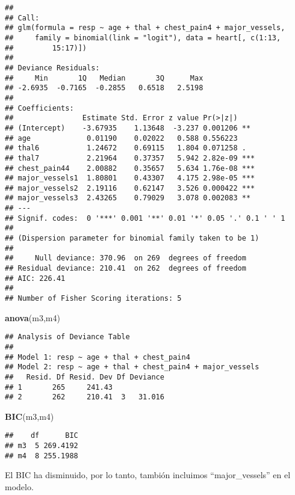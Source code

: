 \documentclass[]{article}
\newenvironment{Shaded}{\begin{snugshade}}{\end{snugshade}}
\newcommand{\KeywordTok}[1]{\textcolor[rgb]{0.13,0.29,0.53}{\textbf{#1}}}
\newcommand{\NormalTok}[1]{#1}
\begin{document}
\begin{verbatim}
## 
## Call:
## glm(formula = resp ~ age + thal + chest_pain4 + major_vessels, 
##     family = binomial(link = "logit"), data = heart[, c(1:13, 
##         15:17)])
## 
## Deviance Residuals: 
##     Min       1Q   Median       3Q      Max  
## -2.6935  -0.7165  -0.2855   0.6518   2.5198  
## 
## Coefficients:
##                Estimate Std. Error z value Pr(>|z|)    
## (Intercept)    -3.67935    1.13648  -3.237 0.001206 ** 
## age             0.01190    0.02022   0.588 0.556223    
## thal6           1.24672    0.69115   1.804 0.071258 .  
## thal7           2.21964    0.37357   5.942 2.82e-09 ***
## chest_pain44    2.00882    0.35657   5.634 1.76e-08 ***
## major_vessels1  1.80801    0.43307   4.175 2.98e-05 ***
## major_vessels2  2.19116    0.62147   3.526 0.000422 ***
## major_vessels3  2.43265    0.79029   3.078 0.002083 ** 
## ---
## Signif. codes:  0 '***' 0.001 '**' 0.01 '*' 0.05 '.' 0.1 ' ' 1
## 
## (Dispersion parameter for binomial family taken to be 1)
## 
##     Null deviance: 370.96  on 269  degrees of freedom
## Residual deviance: 210.41  on 262  degrees of freedom
## AIC: 226.41
## 
## Number of Fisher Scoring iterations: 5
\end{verbatim}

\begin{Shaded}
\begin{Highlighting}[]
\KeywordTok{anova}\NormalTok{(m3,m4)}
\end{Highlighting}
\end{Shaded}

\begin{verbatim}
## Analysis of Deviance Table
## 
## Model 1: resp ~ age + thal + chest_pain4
## Model 2: resp ~ age + thal + chest_pain4 + major_vessels
##   Resid. Df Resid. Dev Df Deviance
## 1       265     241.43            
## 2       262     210.41  3   31.016
\end{verbatim}

\begin{Shaded}
\begin{Highlighting}[]
\KeywordTok{BIC}\NormalTok{(m3,m4)}
\end{Highlighting}
\end{Shaded}

\begin{verbatim}
##    df      BIC
## m3  5 269.4192
## m4  8 255.1988
\end{verbatim}

El BIC ha disminuido, por lo tanto, tambión incluimos ``major\_vessels''
en el modelo.
\end{document}
